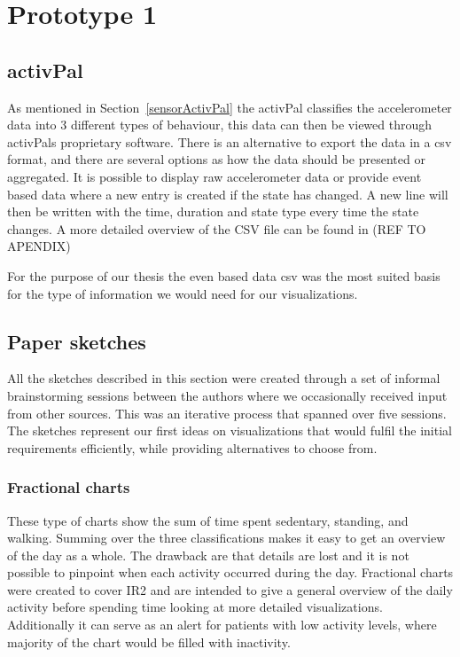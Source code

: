 \chapter{Prototype 1}

\section{activPal}
As mentioned in Section~\ref{sensorActivPal} the activPal classifies the accelerometer data into 3 different types of behaviour, this data can then be viewed through activPals proprietary software. There is an alternative to export the data in a \gls{csv} format, and there are several options as how the data should be presented or aggregated. It is possible to display raw accelerometer data or provide event based data where a new entry is created if the state has changed. A new line will then be written with the time, duration and state type every time the state changes. A more detailed overview of the CSV file can be found in (REF TO APENDIX)

For the purpose of our thesis the even based data \gls{csv} was the most suited basis for the type of information we would need for our visualizations.



\section{Paper sketches}
All the sketches described in this section were created through a set of informal brainstorming sessions between the authors where we occasionally received input from other sources. This was an iterative process that spanned over five sessions. The sketches represent our first ideas on visualizations that would fulfil the initial requirements efficiently, while providing alternatives to choose from. 

\subsection{Fractional charts}
These type of charts show the sum of time spent sedentary, standing, and walking. Summing over the three classifications makes it easy to get an overview of the day as a whole. The drawback are that details are lost and it is not possible to pinpoint when each activity occurred during the day. Fractional charts were created to cover IR2 and are intended to give a general overview of the daily activity before spending time looking at more detailed visualizations. Additionally it can serve as an alert for patients with low activity levels, where majority of the chart would be filled with inactivity.


